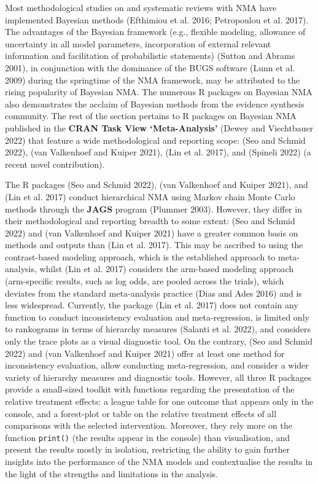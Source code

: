 Most methodological studies on and systematic reviews with NMA have implemented
Bayesian methods (Efthimiou et al. 2016; Petropoulou et al. 2017). The advantages of the Bayesian
framework (e.g., flexible modeling, allowance of uncertainty in all model parameters,
incorporation of external relevant information and facilitation of probabilistic
statements) (Sutton and Abrams 2001), in conjunction with the dominance of the BUGS software
(Lunn et al. 2009) during the springtime of the NMA framework, may be attributed to the
rising popularity of Bayesian NMA. The numerous R packages on Bayesian NMA also
demonstrates the acclaim of Bayesian methods from the evidence synthesis community.
The rest of the section pertains to R packages on Bayesian NMA published in the
\textbf{CRAN Task View `Meta-Analysis'} (Dewey and Viechtbauer 2022) that feature a wide
methodological and reporting scope:  (Seo and Schmid 2022),  (van Valkenhoef and Kuiper 2021),
 (Lin et al. 2017), and  (Spineli 2022) (a recent novel
contribution).

The R packages  (Seo and Schmid 2022),  (van Valkenhoef and Kuiper 2021), and 
(Lin et al. 2017) conduct hierarchical NMA using Markov chain Monte Carlo methods
through the \textbf{JAGS} program (Plummer 2003). However, they differ in their
methodological and reporting breadth to some extent:  (Seo and Schmid 2022)
and  (van Valkenhoef and Kuiper 2021) have a greater common basis on methods and outputs
than  (Lin et al. 2017). This may be ascribed to using the contrast-based
modeling approach, which is the established approach to meta-analysis, whilst
 (Lin et al. 2017) considers the arm-based modeling approach
(arm-specific results, such as log odds, are pooled across the trials), which
deviates from the standard meta-analysis practice (Dias and Ades 2016) and is less widespread.
Currently, the package  (Lin et al. 2017) does not contain any
function to conduct inconsistency evaluation and meta-regression, is limited only
to rankograms in terms of hierarchy measures (Salanti et al. 2022), and considers only
the trace plots as a visual diagnostic tool. On the contrary,  (Seo and Schmid 2022)
and  (van Valkenhoef and Kuiper 2021) offer at least one method for inconsistency evaluation,
allow conducting meta-regression, and consider a wider variety of hierarchy measures
and diagnostic tools. However, all three R packages provide a small-sized toolkit
with functions regarding the presentation of the relative treatment effects: a league
table for one outcome that appears only in the console, and a forest-plot or table
on the relative treatment effects of all comparisons with the selected intervention.
Moreover, they rely more on the function \texttt{print()} (the results appear in the
console) than visualisation, and present the results mostly in isolation, restricting
the ability to gain further insights into the performance of the NMA models and
contextualise the results in the light of the strengths and limitations in the analysis.

